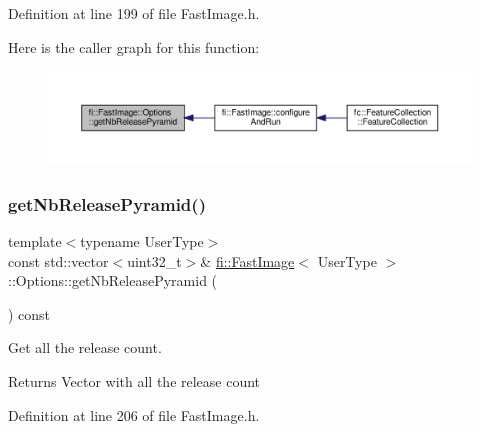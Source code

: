 Definition at line 199 of file Fast\+Image.\+h.

Here is the caller graph for this function\+:
\nopagebreak
\begin{figure}[H]
\begin{center}
\leavevmode
\includegraphics[width=350pt]{dc/db9/classfi_1_1FastImage_1_1Options_ad8ec980d0584b09f7a65e7e502ab8b5e_icgraph}
\end{center}
\end{figure}
\mbox{\label{classfi_1_1FastImage_1_1Options_a87a3e8fc4fcee3a19d4c8ee9885af55c}} 
\subsubsection{\texorpdfstring{get\+Nb\+Release\+Pyramid()}{getNbReleasePyramid()}\hspace{0.1cm}{\footnotesize\ttfamily [2/2]}}
{\footnotesize\ttfamily template$<$typename User\+Type$>$ \\
const std\+::vector$<$uint32\+\_\+t$>$\& \hyperlink{classfi_1_1FastImage}{fi\+::\+Fast\+Image}$<$ User\+Type $>$\+::Options\+::get\+Nb\+Release\+Pyramid (\begin{DoxyParamCaption}{ }\end{DoxyParamCaption}) const\hspace{0.3cm}{\ttfamily [inline]}}



Get all the release count. 

\begin{DoxyReturn}{Returns}
Vector with all the release count 
\end{DoxyReturn}


Definition at line 206 of file Fast\+Image.\+h.

\mbox{\label{classfi_1_1FastImage_1_1Options_a409187a3f6f176cd9e551c3aaed2d944}} 
